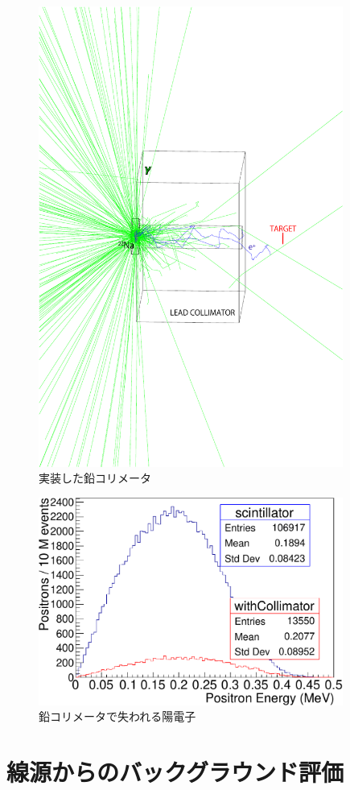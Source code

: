 \begin{figure}[htbp]
	\centering
		\includegraphics[width=10cm]{img/test1b_geometry.pdf}
	\caption{実装した鉛コリメータ}
	\label{test1b_geometry}
\end{figure}

\begin{figure}[htbp]
	\centering
		\includegraphics[width=10cm]{fig/collimator_loss.pdf}
	\caption{鉛コリメータで失われる陽電子}
	\label{collimator_loss}
\end{figure}

\section{線源からのバックグラウンド評価}

